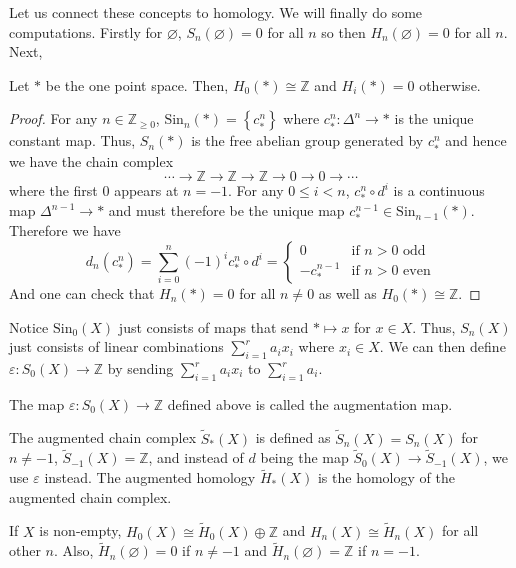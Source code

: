 \documentclass[12pt,reqno]{amsart}
\numberwithin{theorem}{section}
\theoremstyle{definition}
\theoremstyle{remark}
\numberwithin{equation}{section}
\newcommand{\Z}{\mathbb Z}
\newcommand{\set}[1]{\left \{ #1 \right \}}
\theoremstyle{definition}
\newcommand{\Sin}{\mathrm{Sin}}
\begin{document}
Let us connect these concepts to homology. We will finally do some computations. Firstly for $\varnothing$, $S_n(\varnothing)=0$ for all $n$ so then $H_n(\varnothing) = 0$ for all $n$. Next,
\begin{theorem}
    Let $*$ be the one point space. Then, $H_0 (*)\cong \Z$ and $H_i(*) = 0$ otherwise.
\end{theorem}
\begin{proof}
    For any $n \in \Z_{\geq 0}$, $\Sin_n(*) = \set{c_*^n} $ where $c_*^n:\Delta^n \rightarrow *$ is the unique constant map. Thus, $S_n(*) $ is the free abelian group generated by $c_*^n$ and hence we have the chain complex
    $$\cdots \rightarrow \Z \rightarrow \Z \rightarrow \Z \rightarrow 0 \rightarrow 0 \rightarrow \cdots$$
    where the first 0 appears at $n = -1$. For any $0 \leq i < n$, $c_*^n\circ d^i$ is a continuous map $\Delta^{n-1}\rightarrow *$ and must therefore be the unique map $c_*^{n-1} \in \Sin_{n-1}(*)$.
    Therefore we have
    $$d_n(c_*^n) = \sum_{i=0}^n(-1)^i c_*^n\circ d^i = \begin{cases}
        0 & \text{if } n > 0\text{ odd } \\
        -c_*^{n-1} & \text{if }n > 0 \text{ even}
    \end{cases}$$
    And one can check that $H_n(*) = 0$ for all $n \neq 0$ as well as $H_0(*) \cong \Z$.
\end{proof}
Notice $\Sin_0(X)$ just consists of maps that send $*\mapsto x$ for $x \in X$. Thus, $S_n(X)$ just consists of linear combinations $\sum_{i=1}^r a_ix_i$ where $x_i \in X$. We can then define $\varepsilon: S_0(X)\rightarrow \Z$ by sending $\sum_{i=1}^r a_ix_i$ to $\sum_{i=1}^r a_i$. 
\begin{definition}
    The map $\varepsilon: S_0(X) \rightarrow \Z$ defined above is called the augmentation map.
\end{definition}
\begin{definition}
    The augmented chain complex $\tilde S_*(X)$ is defined as $\tilde S_n(X) = S_n(X)$ for $n \neq -1$, $\tilde S_{-1}(X) = \Z$, and instead of $d$ being the map $\tilde S_0(X)\rightarrow \tilde S_{-1}(X)$, we use $\varepsilon$ instead. The augmented homology $\tilde H_*(X)$ is the homology of the augmented chain complex.
\end{definition}
\begin{proposition}
    If $X$ is non-empty, $ H_0(X) \cong \tilde H_0(X)\oplus \Z$ and $H_n(X) \cong \tilde H_n(X)$ for all other $n$. Also, $\tilde H_n(\varnothing) = 0$ if $n \neq -1$ and $\tilde H_n(\varnothing) = \Z$ if $n= -1$.
\end{proposition}
\end{document}
